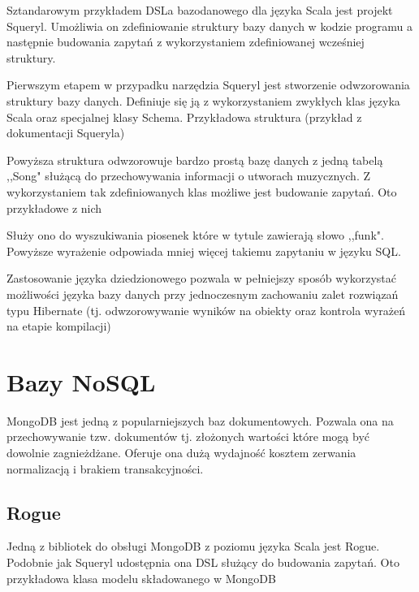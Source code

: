 \documentclass[brudnopis]{xmgr}
\begin{document}
Sztandarowym przykładem DSLa bazodanowego dla języka Scala jest projekt Squeryl. Umożliwia on zdefiniowanie struktury bazy danych w kodzie programu a następnie budowania zapytań z wykorzystaniem zdefiniowanej wcześniej struktury.

Pierwszym etapem w przypadku narzędzia Squeryl jest stworzenie odwzorowania struktury bazy danych. Definiuje się ją z wykorzystaniem zwykłych klas języka Scala oraz specjalnej klasy Schema. Przykładowa struktura (przykład z dokumentacji Squeryla)



Powyższa struktura odwzorowuje bardzo prostą bazę danych z jedną tabelą ,,Song" służącą do przechowywania informacji o utworach muzycznych. Z wykorzystaniem tak zdefiniowanych klas możliwe jest budowanie zapytań. Oto przykładowe z nich



Służy ono do wyszukiwania piosenek które w tytule zawierają słowo ,,funk". Powyższe wyrażenie odpowiada mniej więcej takiemu zapytaniu w języku SQL.



Zastosowanie języka dziedzionowego pozwala w pełniejszy sposób wykorzystać możliwości języka bazy danych przy jednoczesnym zachowaniu zalet rozwiązań typu Hibernate (tj. odwzorowywanie wyników na obiekty oraz kontrola wyrażeń na etapie kompilacji)

\section{Bazy NoSQL}

MongoDB jest jedną z popularniejszych baz dokumentowych. Pozwala ona na przechowywanie tzw. dokumentów tj. złożonych wartości które mogą być dowolnie zagnieżdżane. Oferuje ona dużą wydajność kosztem zerwania normalizacją i brakiem transakcyjności.

\subsection{Rogue}
Jedną z bibliotek do obsługi MongoDB z poziomu języka Scala jest Rogue. Podobnie jak Squeryl udostępnia ona DSL służący do budowania zapytań. Oto przykładowa klasa modelu składowanego w MongoDB


\end{document}
